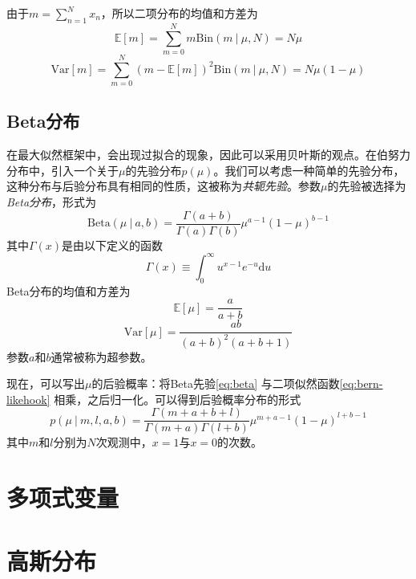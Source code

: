 \documentclass[11pt]{ctexbook}
\begin{document}
由于$m = \sum_{n=1}^{N}x_n$，所以二项分布的均值和方差为
\begin{equation}
	\mathbb E[m] = \sum_{m=0}^{N}m\mathrm{Bin}(m\ |\ \mu, N) = N\mu
\end{equation}
\begin{equation}
	\mathrm{Var}[m] = \sum_{m=0}^{N}(m-\mathbb E[m])^2\mathrm{Bin}(m\ |\ \mu, N) = N\mu(1-\mu)
\end{equation}
\subsection{Beta分布}
在最大似然框架中，会出现过拟合的现象，因此可以采用贝叶斯的观点。在伯努力分布中，引入一个关于$\mu$的先验分布$p(\mu)$。我们可以考虑一种简单的先验分布，这种分布与后验分布具有相同的性质，这被称为\emph{共轭先验}。参数$\mu$的先验被选择为\emph{Beta分布}，形式为
\begin{equation}
	\label{eq:beta}
	\mathrm{Beta}(\mu\ |\ a, b) = \frac{\Gamma(a+b)}{\Gamma(a)\Gamma(b)}\mu^{a-1}(1-\mu)^{b-1}
\end{equation}
其中$\Gamma(x)$是由以下定义的函数
\begin{equation}
	\Gamma(x) \equiv \int_0^{\infty} u^{x-1}e^{-u}\mathrm{d}u
\end{equation}
Beta分布的均值和方差为
\begin{equation}
	\mathbb E[\mu] = \frac{a}{a+b}
\end{equation}
\begin{equation}
	\mathrm{Var}[\mu] = \frac{ab}{(a+b)^2(a+b+1)}
\end{equation}
参数$a$和$b$通常被称为超参数。

现在，可以写出$\mu$的后验概率：将Beta先验\ref{eq:beta} 与二项似然函数\ref{eq:bern-likehook} 相乘，之后归一化。可以得到后验概率分布的形式	
\begin{equation}
	p(\mu\ |\ m, l, a, b) = \frac{\Gamma(m+a+b+l)}{\Gamma(m+a)\Gamma(l+b)}\mu^{m+a-1}(1-\mu)^{l+b-1}
\end{equation}
其中$m$和$l$分别为$N$次观测中，$x=1$与$x=0$的次数。
\section{多项式变量}
\section{高斯分布}
\end{document}
